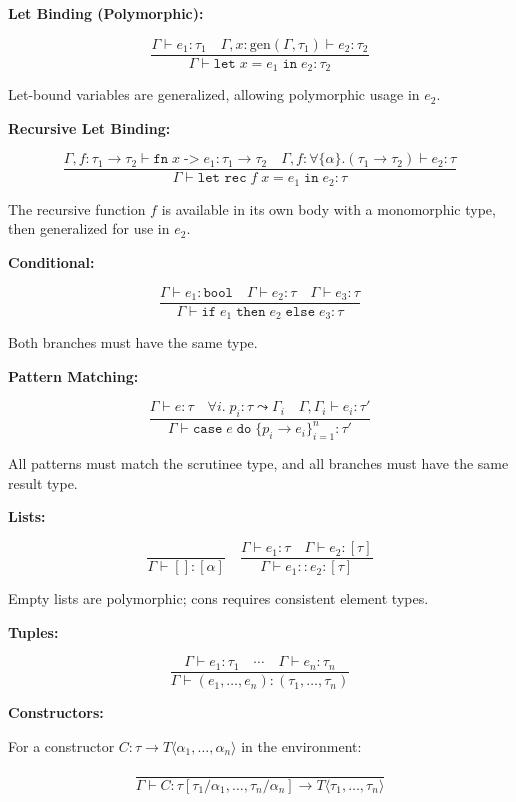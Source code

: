 \documentclass[conference,onecolumn]{IEEEtran}
\begin{document}
\textbf{Let Binding (Polymorphic):}

$$\frac{\Gamma \vdash e_1 : \tau_1 \quad \Gamma, x : \text{gen}(\Gamma, \tau_1) \vdash e_2 : \tau_2}{\Gamma \vdash \texttt{let} \; x = e_1 \; \texttt{in} \; e_2 : \tau_2}$$

Let-bound variables are generalized, allowing polymorphic usage in $e_2$.

\textbf{Recursive Let Binding:}

$$\frac{\Gamma, f : \tau_1 \to \tau_2 \vdash \texttt{fn} \; x \; \texttt{->} \; e_1 : \tau_1 \to \tau_2 \quad \Gamma, f : \forall \{\alpha\}.(\tau_1 \to \tau_2) \vdash e_2 : \tau}{\Gamma \vdash \texttt{let rec} \; f \; x = e_1 \; \texttt{in} \; e_2 : \tau}$$

The recursive function $f$ is available in its own body with a monomorphic type, then generalized for use in $e_2$.

\textbf{Conditional:}

$$\frac{\Gamma \vdash e_1 : \texttt{bool} \quad \Gamma \vdash e_2 : \tau \quad \Gamma \vdash e_3 : \tau}{\Gamma \vdash \texttt{if} \; e_1 \; \texttt{then} \; e_2 \; \texttt{else} \; e_3 : \tau}$$

Both branches must have the same type.

\textbf{Pattern Matching:}

$$\frac{\Gamma \vdash e : \tau \quad \forall i.\; p_i : \tau \leadsto \Gamma_i \quad \Gamma, \Gamma_i \vdash e_i : \tau'}{\Gamma \vdash \texttt{case} \; e \; \texttt{do} \; \{p_i \to e_i\}^n_{i=1} : \tau'}$$

All patterns must match the scrutinee type, and all branches must have the same result type.

\textbf{Lists:}

$$\frac{}{\Gamma \vdash [] : [\alpha]}
\quad
\frac{\Gamma \vdash e_1 : \tau \quad \Gamma \vdash e_2 : [\tau]}{\Gamma \vdash e_1 :: e_2 : [\tau]}$$

Empty lists are polymorphic; cons requires consistent element types.

\textbf{Tuples:}

$$\frac{\Gamma \vdash e_1 : \tau_1 \quad \cdots \quad \Gamma \vdash e_n : \tau_n}{\Gamma \vdash (e_1, \ldots, e_n) : (\tau_1, \ldots, \tau_n)}$$

\textbf{Constructors:}

For a constructor $C : \tau \to T\langle\alpha_1, \ldots, \alpha_n\rangle$ in the environment:

$$\frac{}{\Gamma \vdash C : \tau[\tau_1/\alpha_1, \ldots, \tau_n/\alpha_n] \to T\langle\tau_1, \ldots, \tau_n\rangle}$$
\end{document}
